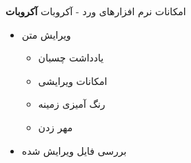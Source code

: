 \documentclass[12pt]{beamer}
\makeatletter
\newcommand{\rtlist}{\raggedleft\rightskip\@totalleftmargin}
\newcommand{\frametitlefontsize}{\fontsize{20pt}{0pt}\selectfont}
\makeatother
\begin{document}
\begin{persian}
\begin{frame}{\frametitlefontsize امکانات نرم افزارهای ورد - آکروبات}
		\textbf{آکروبات}
		\begin{itemize}\rtlist
			\item ویرایش متن
			\begin{itemize}\rtlist
				\item یادداشت چسبان
				\item امکانات ویرایشی
				\item رنگ آمیزی زمینه
				\item مهر زدن
			\end{itemize}
			\item بررسی فایل ویرایش شده
		\end{itemize}		
	\end{frame}
	
\end{persian}
\end{document}
